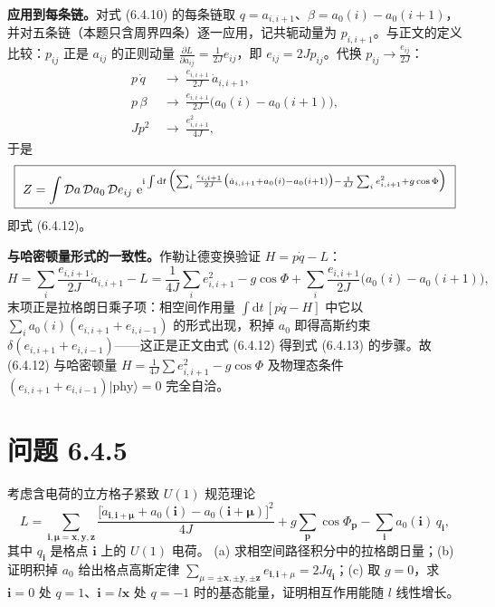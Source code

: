 \textbf{应用到每条链。}对式 (6.4.10) 的每条链取 $q=a_{i,i+1}$、$\beta=a_0(i)-a_0(i+1)$，并对五条链（本题只含周界四条）逐一应用，记共轭动量为 $p_{i,i+1}$。与正文的定义比较：$p_{ij}$ 正是 $a_{ij}$ 的正则动量 $\frac{\partial L}{\partial\dot a_{ij}}=\frac{1}{2J}e_{ij}$，即 $e_{ij}=2Jp_{ij}$。代换 $p_{ij}\to\frac{e_{ij}}{2J}$：
\begin{align*}
p\,\dot q&\ \longrightarrow\ \frac{e_{i,i+1}}{2J}\,\dot a_{i,i+1},\\
p\,\beta&\ \longrightarrow\ \frac{e_{i,i+1}}{2J}\bigl(a_0(i)-a_0(i+1)\bigr),\\
Jp^{2}&\ \longrightarrow\ \frac{e_{i,i+1}^{2}}{4J},
\end{align*}
于是
\begin{equation*}
\boxed{\ Z=\int\mathcal{D}a\,\mathcal{D}a_0\,\mathcal{D}e_{ij}\ \mathrm{e}^{\mathrm{i}\int\mathrm{d}t\,\Bigl(\sum_i\frac{e_{i,i+1}}{2J}\bigl(\dot a_{i,i+1}+a_0(i)-a_0(i+1)\bigr)-\frac{1}{4J}\sum_ie_{i,i+1}^{2}+g\cos\Phi\Bigr)}\ }
\end{equation*}
即式 (6.4.12)。

\textbf{与哈密顿量形式的一致性。}作勒让德变换验证 $H=p\dot q-L$：
\begin{equation*}
H=\sum_i\frac{e_{i,i+1}}{2J}\dot a_{i,i+1}-L
=\frac{1}{4J}\sum_ie_{i,i+1}^{2}-g\cos\Phi
+\sum_i\frac{e_{i,i+1}}{2J}\bigl(a_0(i)-a_0(i+1)\bigr),
\end{equation*}
末项正是拉格朗日乘子项：相空间作用量 $\int\mathrm{d}t\,[p\dot q-H]$ 中它以 $\sum_i a_0(i)(e_{i,i+1}+e_{i,i-1})$ 的形式出现，积掉 $a_0$ 即得高斯约束 $\delta(e_{i,i+1}+e_{i,i-1})$——这正是正文由式 (6.4.12) 得到式 (6.4.13) 的步骤。故 (6.4.12) 与哈密顿量 $H=\frac{1}{4J}\sum e_{i,i+1}^{2}-g\cos\Phi$ 及物理态条件 $(e_{i,i+1}+e_{i,i-1})|\text{phy}\rangle=0$ 完全自洽。

\section*{问题 6.4.5}
\begin{problem}
考虑含电荷的立方格子紧致 $U(1)$ 规范理论
\begin{equation*}
L=\sum_{\pmb i,\pmb\mu=\pmb x,\pmb y,\pmb z}\frac{\bigl[\dot a_{\pmb i,\pmb i+\pmb\mu}+a_0(\pmb i)-a_0(\pmb i+\pmb\mu)\bigr]^{2}}{4J}+g\sum_{\pmb p}\cos\Phi_{\pmb p}-\sum_{\pmb i}a_0(\pmb i)\,q_{\pmb i} ,
\end{equation*}
其中 $q_{\pmb i}$ 是格点 $\pmb i$ 上的 $U(1)$ 电荷。
(a) 求相空间路径积分中的拉格朗日量；(b) 证明积掉 $a_0$ 给出格点高斯定律 $\sum_{\mu=\pm\pmb x,\pm\pmb y,\pm\pmb z}e_{\pmb i,\pmb i+\mu}=2Jq_{\pmb i}$；(c) 取 $g=0$，求 $\pmb i=0$ 处 $q=1$、$\pmb i=l\pmb x$ 处 $q=-1$ 时的基态能量，证明相互作用能随 $l$ 线性增长。
\end{problem}
\solution

